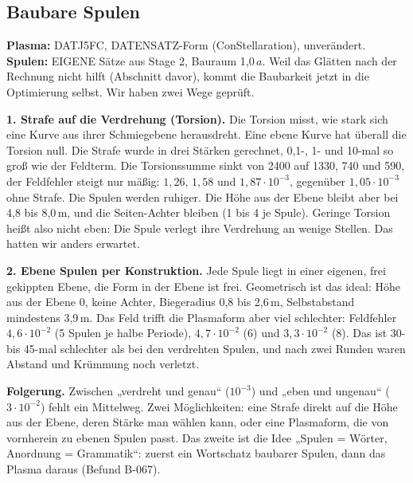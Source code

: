 \subsection{Baubare Spulen}\label{sec:baubare-spulen}
\textbf{Plasma:} DATJ5FC, DATENSATZ-Form (ConStellaration), unverändert. \textbf{Spulen:} EIGENE Sätze aus Stage 2, Bauraum 1,0\,$a$. Weil das Glätten nach der Rechnung nicht hilft (Abschnitt davor), kommt die Baubarkeit jetzt in die Optimierung selbst. Wir haben zwei Wege geprüft.

\textbf{1. Strafe auf die Verdrehung (Torsion).} Die Torsion misst, wie stark sich eine Kurve aus ihrer Schmiegebene herausdreht. Eine ebene Kurve hat überall die Torsion null. Die Strafe wurde in drei Stärken gerechnet, 0,1-, 1- und 10-mal so groß wie der Feldterm. Die Torsionssumme sinkt von 2400 auf 1330, 740 und 590, der Feldfehler steigt nur mäßig: $1{,}26$, $1{,}58$ und $1{,}87\cdot10^{-3}$, gegenüber $1{,}05\cdot10^{-3}$ ohne Strafe. Die Spulen werden ruhiger. Die Höhe aus der Ebene bleibt aber bei 4,8 bis 8,0\,m, und die Seiten-Achter bleiben (1 bis 4 je Spule). Geringe Torsion heißt also nicht eben: Die Spule verlegt ihre Verdrehung an wenige Stellen. Das hatten wir anders erwartet.

\textbf{2. Ebene Spulen per Konstruktion.} Jede Spule liegt in einer eigenen, frei gekippten Ebene, die Form in der Ebene ist frei. Geometrisch ist das ideal: Höhe aus der Ebene 0, keine Achter, Biegeradius 0,8 bis 2,6\,m, Selbstabstand mindestens 3,9\,m. Das Feld trifft die Plasmaform aber viel schlechter: Feldfehler $4{,}6\cdot10^{-2}$ (5 Spulen je halbe Periode), $4{,}7\cdot10^{-2}$ (6) und $3{,}3\cdot10^{-2}$ (8). Das ist 30- bis 45-mal schlechter als bei den verdrehten Spulen, und nach zwei Runden waren Abstand und Krümmung noch verletzt.

\textbf{Folgerung.} Zwischen „verdreht und genau“ ($10^{-3}$) und „eben und ungenau“ ($3\cdot10^{-2}$) fehlt ein Mittelweg. Zwei Möglichkeiten: eine Strafe direkt auf die Höhe aus der Ebene, deren Stärke man wählen kann, oder eine Plasmaform, die von vornherein zu ebenen Spulen passt. Das zweite ist die Idee „Spulen = Wörter, Anordnung = Grammatik“: zuerst ein Wortschatz baubarer Spulen, dann das Plasma daraus (Befund B-067).

